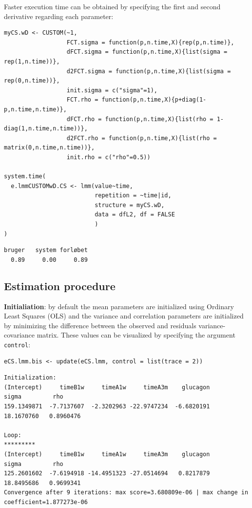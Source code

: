 \documentclass[12pt]{article}
\begin{document}
Faster execution time can be obtained by specifying the first and
second derivative regarding each parameter:
\lstset{language=r,label= ,caption= ,captionpos=b,numbers=none}
\begin{lstlisting}
myCS.wD <- CUSTOM(~1,
                  FCT.sigma = function(p,n.time,X){rep(p,n.time)},
                  dFCT.sigma = function(p,n.time,X){list(sigma = rep(1,n.time))},
                  d2FCT.sigma = function(p,n.time,X){list(sigma = rep(0,n.time))},
                  init.sigma = c("sigma"=1),
                  FCT.rho = function(p,n.time,X){p+diag(1-p,n.time,n.time)},
                  dFCT.rho = function(p,n.time,X){list(rho = 1-diag(1,n.time,n.time))},
                  d2FCT.rho = function(p,n.time,X){list(rho = matrix(0,n.time,n.time))},
                  init.rho = c("rho"=0.5))

system.time(
  e.lmmCUSTOMwD.CS <- lmm(value~time,
                          repetition = ~time|id,
                          structure = myCS.wD, 
                          data = dfL2, df = FALSE
                          )
)
\end{lstlisting}

\begin{verbatim}
bruger   system forløbet 
  0.89     0.00     0.89
\end{verbatim}



\clearpage

\subsection{Estimation procedure}
\label{sec:orgbb0e93a}

\textbf{Initialiation}: by default the mean parameters are initialized using
 Ordinary Least Squares (OLS) and the variance and correlation
 parameters are initialized by minimizing the difference between the
 observed and residuals variance-covariance matrix. These values can
 be visualized by specifying the argument \texttt{control}:
\lstset{language=r,label= ,caption= ,captionpos=b,numbers=none}
\begin{lstlisting}
eCS.lmm.bis <- update(eCS.lmm, control = list(trace = 2))
\end{lstlisting}

\begin{verbatim}
Initialization:
(Intercept)     timeB1w     timeA1w     timeA3m    glucagon       sigma         rho 
159.1349871  -7.7137607  -2.3202963 -22.9747234  -6.6820191  18.1670760   0.8960476 

Loop:
*********
(Intercept)     timeB1w     timeA1w     timeA3m    glucagon       sigma         rho 
125.2601602  -7.6194918 -14.4951323 -27.0514694   0.8217879  18.8495686   0.9699341 
Convergence after 9 iterations: max score=3.680809e-06 | max change in coefficient=1.877273e-06
\end{verbatim}
\end{document}
